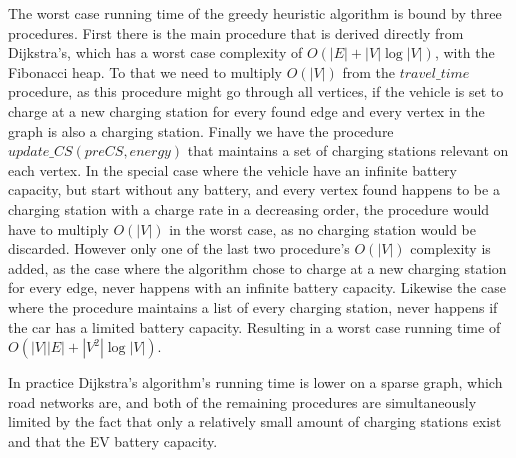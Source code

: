 The worst case running time of the greedy heuristic algorithm is bound by three procedures. First there is the main procedure that is derived directly from Dijkstra's, which has a worst case complexity of $O(|E|+|V|\log|V|)$, with the Fibonacci heap. To that we need to multiply $O(|V|)$ from the $travel\_time$ procedure, as this procedure might go through all vertices, if the vehicle is set to charge at a new charging station for every found edge and every vertex in the graph is also a charging station. Finally we have the procedure $update\_CS(preCS, energy)$ that maintains a set of charging stations relevant on each vertex. In the special case where the vehicle have an infinite battery capacity, but start without any battery, and every vertex found happens to be a charging station with a charge rate in a decreasing order, the procedure would have to multiply $O(|V|)$ in the worst case, as no charging station would be discarded.
However only one of the last two procedure's $O(|V|)$ complexity is added, as the case where the algorithm chose to charge at a new charging station for every edge, never happens with an infinite battery capacity. Likewise the case where the procedure maintains a list of every charging station, never happens if the car has a limited battery capacity. Resulting in a worst case running time of $O(|V||E|+|V^2|\log|V|)$. %

In practice Dijkstra's algorithm's running time is lower on a sparse graph, which road networks are, and both of the remaining procedures are simultaneously limited by the fact that only a relatively small amount of charging stations exist and that the EV battery capacity.